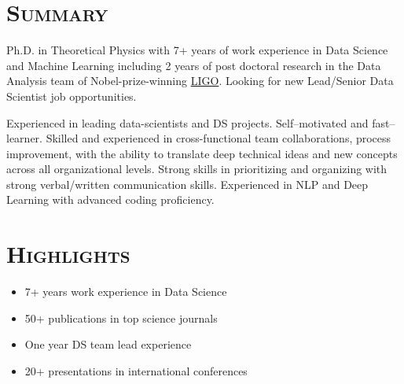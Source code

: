 \documentclass[10pt,a4paper]{moderncv}
\begin{document}
\maketitle


\section{\textsc{Summary}}

Ph.D. in Theoretical Physics with 7+ years of work experience in Data Science and Machine Learning including 2 years of post doctoral research in the Data Analysis team of Nobel-prize-winning \href{http://www.ligo.org}{LIGO}. Looking for new Lead/Senior Data Scientist job opportunities.
\vspace{0.2cm}

Experienced in leading data-scientists and DS projects. Self–motivated and fast–learner. Skilled and experienced in cross-functional team collaborations, process improvement, with the ability to translate deep technical ideas and new concepts across all organizational levels. Strong skills in prioritizing and organizing with strong verbal/written communication skills. Experienced in NLP and Deep Learning with advanced coding proficiency.

\section{\textsc{Highlights}}
\vspace{-0.5cm}
\begin{multicols}{2}
\begin{itemize}
\item 7+ years work experience in Data Science
\item 50+ publications in top science journals
\item One year DS team lead experience
\item 20+ presentations in international conferences
\end{itemize}
\end{multicols}
\vspace{0.2cm}
\vspace{-0.5cm}
\end{document}
